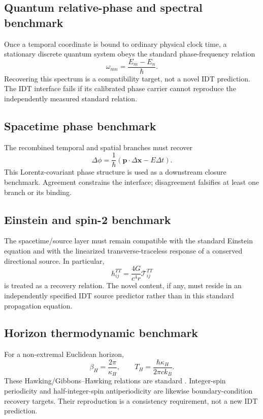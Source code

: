 \documentclass[11pt]{book}
\begin{document}
\subsection{Quantum relative-phase and spectral benchmark}

Once a temporal coordinate is bound to ordinary physical clock time, a stationary discrete quantum system obeys the standard phase-frequency relation
\[
\boxed{
\omega_{mn}=\frac{E_m-E_n}{\hbar}.
}
\]
Recovering this spectrum is a compatibility target, not a novel IDT prediction. The IDT interface fails if its calibrated phase carrier cannot reproduce the independently measured standard relation.

\subsection{Spacetime phase benchmark}

The recombined temporal and spatial branches must recover
\[
\boxed{
\Delta\phi
=
\frac{1}{\hbar}
\left(\mathbf p\cdot\Delta\mathbf x-E\Delta t\right).
}
\]
This Lorentz-covariant phase structure is used as a downstream closure benchmark. Agreement constrains the interface; disagreement falsifies at least one branch or its binding.

\subsection{Einstein and spin-2 benchmark}

The spacetime/source layer must remain compatible with the standard Einstein equation \cite{Einstein1916} and with the linearized transverse-traceless response of a conserved directional source. In particular,
\[
h_{ij}^{TT}
=
\frac{4G}{c^4r}\mathcal T_{ij}^{TT}
\]
is treated as a recovery relation. The novel content, if any, must reside in an independently specified IDT source predictor rather than in this standard propagation equation.

\subsection{Horizon thermodynamic benchmark}

For a non-extremal Euclidean horizon,
\[
\beta_H=\frac{2\pi}{\kappa_H},
\qquad
\boxed{
T_H=\frac{\hbar\kappa_H}{2\pi c k_B}.
}
\]
These Hawking/Gibbons--Hawking relations are standard \cite{Hawking1975,GibbonsHawking1977}. Integer-spin periodicity and half-integer-spin antiperiodicity are likewise boundary-condition recovery targets. Their reproduction is a consistency requirement, not a new IDT prediction.
\end{document}
